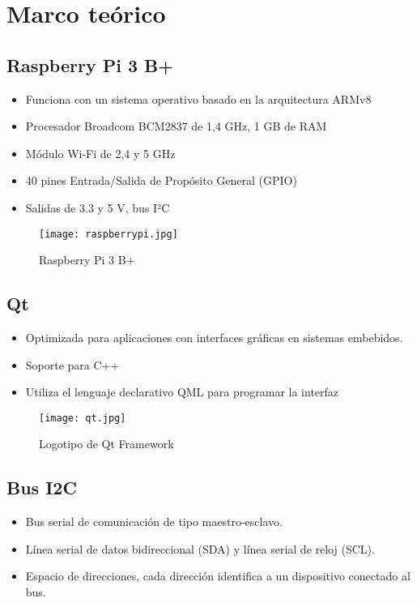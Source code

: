 \section{Marco teórico}

\subsection*{Raspberry Pi 3 B+}
\begin{itemize}
	\item Funciona con un sistema operativo basado en la arquitectura ARMv8
	\item Procesador Broadcom BCM2837 de 1,4 GHz, 1 GB de RAM
	\item Módulo Wi-Fi de 2,4 y 5 GHz
	\item 40 pines Entrada/Salida de Propósito General (GPIO)
	\item Salidas de 3.3 y 5 V, bus I²C
\end{itemize}

\begin{figure}[htb]
	\centering
	\texttt{[image: raspberrypi.jpg]}
	\caption{Raspberry Pi 3 B+}
\end{figure}

\subsection*{Qt}
\begin{itemize}
	\item Optimizada para aplicaciones con interfaces gráficas en sistemas embebidos.
	\item Soporte para C++
	\item Utiliza el lenguaje declarativo QML para programar la interfaz
\end{itemize}

\begin{figure}[htb]
	\centering
	\texttt{[image: qt.jpg]}
	\caption{Logotipo de Qt Framework}
\end{figure}

\subsection*{Bus I2C}
\begin{itemize}
	\item Bus serial de comunicación de tipo maestro-esclavo.
	\item Línea serial de datos bidireccional (SDA)  y línea serial de reloj (SCL).
	\item Espacio de direcciones, cada dirección identifica a un dispositivo conectado al bus.
\end{itemize}

